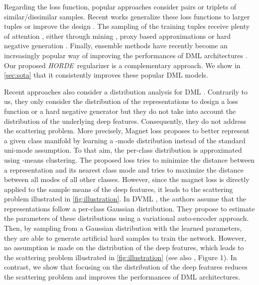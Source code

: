 \documentclass[10pt,twocolumn,letterpaper]{article}
\def\ourmethod{\textit{HORDE}}
\begin{document}
    Regarding the loss function, popular approaches consider pairs \cite{Chopra_CVPR_2005} or triplets \cite{Schroff_2015_CVPR} of similar/dissimilar samples.
    Recent works generalize these loss functions to larger tuples \cite{Chen_2017_CVPR, Song_2016_CVPR, Sohn_2016_NIPS, Ustinova_2016_NIPS} or improve the design \cite{Wang_2018_CVPR, Wang_2017_ICCV, Yu_2018_ECCV}.
    The sampling of the training tuples receive plenty of attention \cite{Song_2016_CVPR, Schroff_2015_CVPR, Sohn_2016_NIPS}, either through mining \cite{Harwood_2017_ICCV, Schroff_2015_CVPR}, proxy based approximations \cite{Movshovitz-Attias_2017_ICCV, Song_2017_CVPR} or hard negative generation \cite{Duan_2018_CVPR, Lin_2018_ECCV}.
    Finally, ensemble methods have recently become an increasingly popular way of improving the performances of DML architectures \cite{Kim_2018_ECCV, Opitz_2017_ICCV, Xuan_2018_ECCV, Yuan_2017_ICCV}.
    Our proposed \ourmethod \ regularizer is a complementary approach.
    We show in \autoref{sec:sota} that it consistently improves these popular DML models.
    
    Recent approaches also consider a distribution analysis for DML \cite{Rippel_2016_ICLR,Lin_2018_ECCV}.
    Contrarily to us, they only consider the distribution of the representations to design a loss function or a hard negative generator but they do not take into account the distribution of the underlying deep features.
    Consequently, they do not address the scattering problem.
More precisely, Magnet loss \cite{Rippel_2016_ICLR} proposes to better represent a given class manifold by learning a -mode distribution instead of the standard uni-mode assumption.
    To that aim, the per-class distribution is approximated using -means clustering.
    The proposed loss tries to minimize the distance between a representation and its nearest class mode and tries to maximize the distance between all modes of all other classes.
    However, since the magnet loss is directly applied to the sample means of the deep features, it leads to the scattering problem illustrated in \autoref{fig:illustration}.
    In DVML \cite{Lin_2018_ECCV}, the authors assume that the representations follow a per-class Gaussian distribution. They propose to estimate the parameters of these distributions using a variational auto-encoder approach.
    Then, by sampling from a Gaussian distribution with the learned parameters, they are able to generate artificial hard samples to train the network.
    However, no assumption is made on the distribution of the deep features, which leads to the scattering problem illustrated in \autoref{fig:illustration} (see also \cite{Lin_2018_ECCV}, Figure 1).
    In contrast, we show that focusing on the distribution of the deep features reduces the scattering problem and improves the performances of DML architectures.
\end{document}
